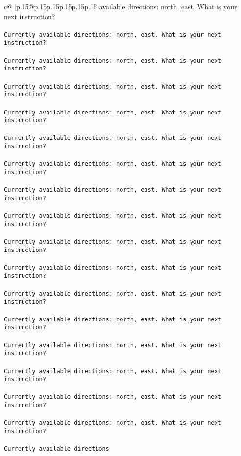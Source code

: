 \documentclass{article}
\begin{document}
{\begin{supertabular}{c@{$\;$}|p{.15\linewidth}@{}p{.15\linewidth}p{.15\linewidth}p{.15\linewidth}p{.15\linewidth}p{.15\linewidth}}
{{{available directions: north, east. What is your next instruction?\\ \tt \\ \tt Currently available directions: north, east. What is your next instruction?\\ \tt \\ \tt Currently available directions: north, east. What is your next instruction?\\ \tt \\ \tt Currently available directions: north, east. What is your next instruction?\\ \tt \\ \tt Currently available directions: north, east. What is your next instruction?\\ \tt \\ \tt Currently available directions: north, east. What is your next instruction?\\ \tt \\ \tt Currently available directions: north, east. What is your next instruction?\\ \tt \\ \tt Currently available directions: north, east. What is your next instruction?\\ \tt \\ \tt Currently available directions: north, east. What is your next instruction?\\ \tt \\ \tt Currently available directions: north, east. What is your next instruction?\\ \tt \\ \tt Currently available directions: north, east. What is your next instruction?\\ \tt \\ \tt Currently available directions: north, east. What is your next instruction?\\ \tt \\ \tt Currently available directions: north, east. What is your next instruction?\\ \tt \\ \tt Currently available directions: north, east. What is your next instruction?\\ \tt \\ \tt Currently available directions: north, east. What is your next instruction?\\ \tt \\ \tt Currently available directions: north, east. What is your next instruction?\\ \tt \\ \tt Currently available directions: north, east. What is your next instruction?\\ \tt \\ \tt Currently available directions 
	  } 
	   } 
	   } 
	  \\ 
 


\end{supertabular}}
\end{document}
